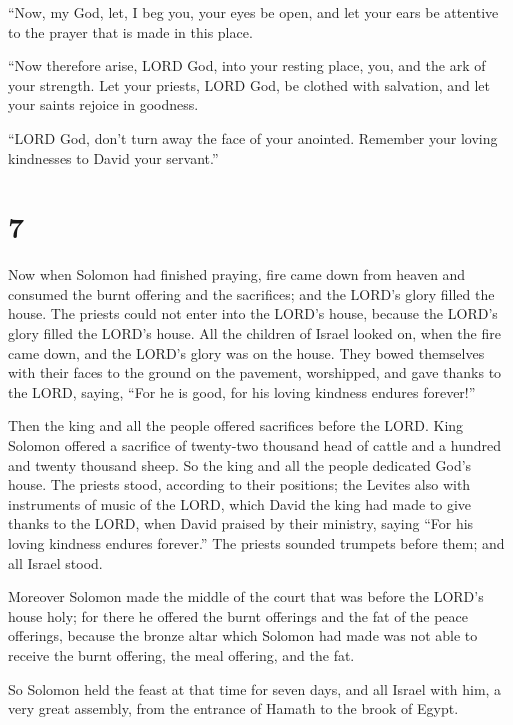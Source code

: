  ``Now, my God, let, I beg you, your eyes be open, and
let your ears be attentive to the prayer that is made in this place.

 ``Now therefore arise, LORD God, into your resting
place, you, and the ark of your strength. Let your priests, LORD God, be
clothed with salvation, and let your saints rejoice in goodness.

 ``LORD God, don't turn away the face of your anointed.
Remember your loving kindnesses to David your servant.''

\hypertarget{section-6}{%
\section{7}\label{section-6}}

 Now when Solomon had finished praying, fire came down
from heaven and consumed the burnt offering and the sacrifices; and the
LORD's glory filled the house.  The priests could not
enter into the LORD's house, because the LORD's glory filled the LORD's
house.  All the children of Israel looked on, when the
fire came down, and the LORD's glory was on the house. They bowed
themselves with their faces to the ground on the pavement, worshipped,
and gave thanks to the LORD, saying, ``For he is good, for his loving
kindness endures forever!''

 Then the king and all the people offered sacrifices
before the LORD.  King Solomon offered a sacrifice of
twenty-two thousand head of cattle and a hundred and twenty thousand
sheep. So the king and all the people dedicated God's house.
 The priests stood, according to their positions; the
Levites also with instruments of music of the LORD, which David the king
had made to give thanks to the LORD, when David praised by their
ministry, saying ``For his loving kindness endures forever.'' The
priests sounded trumpets before them; and all Israel stood.

 Moreover Solomon made the middle of the court that was
before the LORD's house holy; for there he offered the burnt offerings
and the fat of the peace offerings, because the bronze altar which
Solomon had made was not able to receive the burnt offering, the meal
offering, and the fat.

 So Solomon held the feast at that time for seven days,
and all Israel with him, a very great assembly, from the entrance of
Hamath to the brook of Egypt.

